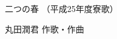 \documentclass[10pt,b5j]{tarticle} %
\begin{document}
\begin{minipage}[c]{0.7\hsize} %
    \begin{center}
        {\LARGE
            二つの春 %
        }
        {\small 
            （平成25年度寮歌） %
        }
    \end{center}
\end{minipage}
\begin{minipage}[c]{0.3\hsize} %
    \begin{flushright} %
        丸田潤君 作歌・作曲 %
    \end{flushright}
\end{minipage}
\end{document}

